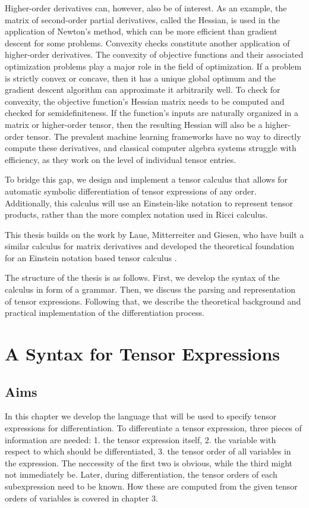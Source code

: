 \documentclass[12pt, a4paper]{report}
\begin{document}
Higher-order derivatives can, however, also be of interest.
As an example, the matrix of second-order partial derivatives, called the Hessian, is used in the application of Newton's method, which can be more efficient than gradient descent for some problems.
Convexity checks constitute another application of higher-order derivatives.
The convexity of objective functions and their associated optimization problems play a major role in the field of optimization.
If a problem is strictly convex or concave, then it has a unique global optimum and the gradient descent algorithm can approximate it arbitrarily well.
To check for convexity, the objective function's Hessian matrix needs to be computed and checked for semidefiniteness.
If the function's inputs are naturally organized in a matrix or higher-order tensor, then the resulting Hessian will also be a higher-order tensor.
The prevalent machine learning frameworks have no way to directly compute these derivatives, and classical computer algebra systems struggle with efficiency, as they work on the level of individual tensor entries.

To bridge this gap, we design and implement a tensor calculus that allows for automatic symbolic differentiation of tensor expressions of any order.
Additionally, this calculus will use an Einstein-like notation to represent tensor products, rather than the more complex notation used in Ricci calculus.

This thesis builds on the work by Laue, Mitterreiter and Giesen, who have built a similar calculus for matrix derivatives \cite{matrixpaper} and developed the theoretical foundation for an Einstein notation based tensor calculus \cite{tensorpaper}.

The structure of the thesis is as follows.
First, we develop the syntax of the calculus in form of a grammar.
Then, we discuss the parsing and representation of tensor expressions.
Following that, we describe the theoretical background and practical implementation of the differentiation process.

\chapter{A Syntax for Tensor Expressions}
\section{Aims}
In this chapter we develop the language that will be used to specify tensor expressions for differentiation.
To differentiate a tensor expression, three pieces of information are needed: 1. the tensor expression itself, 2. the variable with respect to which should be differentiated, 3. the tensor order of all variables in the expression.
The neccessity of the first two is obvious, while the third might not immediately be.
Later, during differentiation, the tensor orders of each subexpression need to be known.
How these are computed from the given tensor orders of variables is covered in chapter 3.
\end{document}
